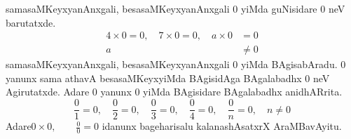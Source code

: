 samasaMKeyxyanAnxgali, besasaMKeyxyanAnxgali $0$ yiMda guNisidare  $0$ neV barutatxde.
\begin{align*}
4\times 0 = 0,\quad 7\times 0 = 0,\quad a\times 0 &= 0\\
 a &\neq 0
\end{align*}
samasaMKeyxyanAnxgali, besasaMKeyxyanAnxgali $0$ yiMda BAgisabAradu. $0$ yanunx sama athavA besasaMKeyxyiMda BAgisidAga BAgalabadhx $0$ neV Agirutatxde. Adare $0$ yanunx $0$ yiMda BAgisidare BAgalabadhx anidhARrita.
$$
\frac{0}{1} = 0, \quad \frac{0}{2}=0,\quad \frac{0}{3}=0, \quad \frac{0}{4}=0, \quad \frac{0}{n} = 0, \quad n\neq 0
$$
Adare\quad $0\times 0,\quad \quad \frac{0}{0}=0$ idanunx bageharisalu kalanashAsatxrX AraMBavAyitu.  
